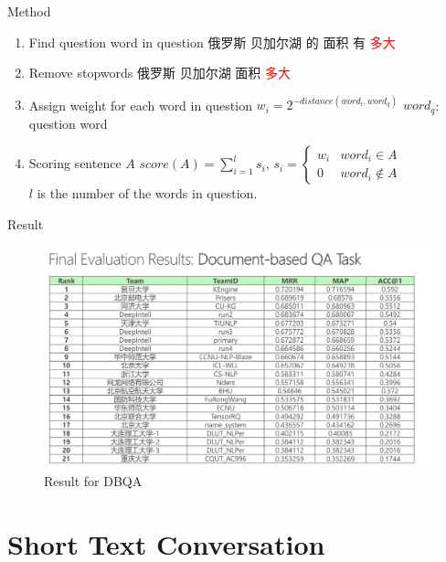 \documentclass{beamer}
\begin{document}
  \begin{frame}{Method}
    \begin{enumerate}
      \item Find question word in question \newline
      俄罗斯 {} 贝加尔湖 {} 的 {} 面积 {} 有 {} \textcolor{red}{多大}
      \item Remove stopwords \newline
      俄罗斯 {} 贝加尔湖 {} 面积 {} \textcolor{red}{多大}
      \item Assign weight for each word in question \newline
        $w_i = 2^{-distance(word_i, word_q)}$ {}{}{} $word_q$: question word
      \item Scoring sentence $A$ \newline
        $ score(A) = \sum_{i=1}^{l} s_i $, {}{}{} $ s_i=\begin{cases}w_i & word_i \in A  \\ 0 & word_i \notin A \end{cases} $ \\
        $l$ is the number of the words in question.
    \end{enumerate}
  \end{frame}

  \begin{frame}{Result}
    \begin{center}
      \begin{figure}
      \includegraphics[width=\textwidth,height=\textheight,keepaspectratio]{result-dbqa.png}
      \caption{Result for DBQA}
      \end{figure}
    \end{center}
  \end{frame}

  \section{Short Text Conversation}
\end{document}
